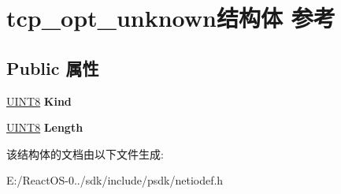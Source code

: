 \hypertarget{structtcp__opt__unknown}{}\section{tcp\+\_\+opt\+\_\+unknown结构体 参考}
\label{structtcp__opt__unknown}
\subsection*{Public 属性}
\begin{DoxyCompactItemize}
\item 
\mbox{\label{structtcp__opt__unknown_a01ac9cf39bca639e9214489312005c58}} 
\hyperlink{_processor_bind_8h_ab27e9918b538ce9d8ca692479b375b6a}{U\+I\+N\+T8} {\bfseries Kind}
\item 
\mbox{\label{structtcp__opt__unknown_a489df5a483de4be31202e370a43b2926}} 
\hyperlink{_processor_bind_8h_ab27e9918b538ce9d8ca692479b375b6a}{U\+I\+N\+T8} {\bfseries Length}
\end{DoxyCompactItemize}


该结构体的文档由以下文件生成\+:\begin{DoxyCompactItemize}
\item 
E\+:/\+React\+O\+S-\/0../sdk/include/psdk/netiodef.\+h\end{DoxyCompactItemize}

